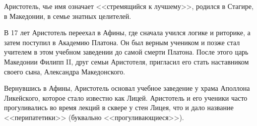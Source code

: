 

Аристотель, чье имя означает <<стремящийся к лучшему>>, родился в Стагире, в Македонии, в семье знатных целителей. 

В 17 лет Аристотель переехал в Афины, где сначала учился логике и риторике, а затем поступил в Академию Платона. Он был верным учеником и позже стал учителем в этом учебном заведении до самой смерти Платона. После этого царь Македонии Филипп II, друг семьи Аристотеля, пригласил его стать наставником своего сына, Александра Македонского.

Вернувшись в Афины, Аристотель основал учебное заведение у храма Аполлона Ликейского, которое стало известно как Лицей. Аристотель и его ученики часто прогуливались во время лекций в сквере у стен Лицея, что и дало название <<перипатетики>> (буквально <<прогуливающиеся>>).

